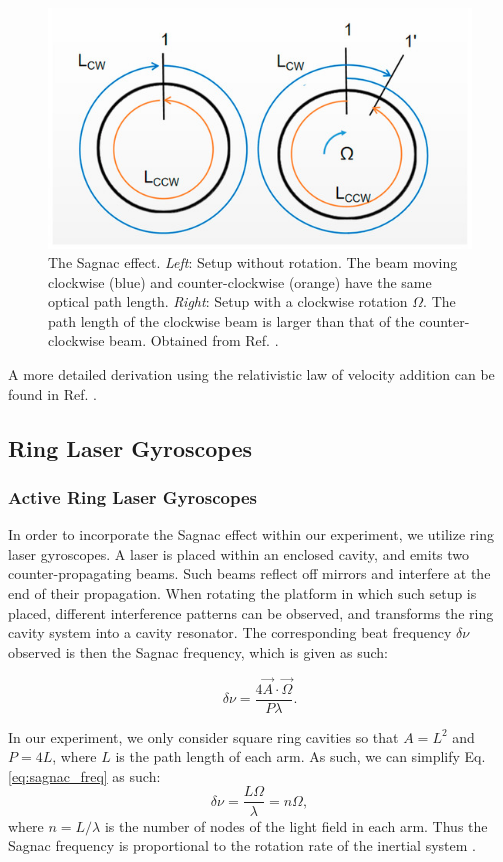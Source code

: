\documentclass[a4paper]{report}
\numberwithin{equation}{section}
\begin{document}
\begin{figure}[h!]
	\centering
	\includegraphics[width=0.6\columnwidth]{sagnac_effect.jpg}
	\caption{The Sagnac effect. \textit{Left}: Setup without rotation. The beam moving clockwise (blue) and counter-clockwise (orange)
	have the same optical path length. \textit{Right}: Setup with a clockwise rotation $\Omega$. The path length of the 
	clockwise beam is larger than that of the counter-clockwise beam. Obtained from Ref. \cite{Feng2020}.}
	\label{fig:sagnac_effect}
\end{figure}

A more detailed derivation using the relativistic law of velocity addition can be found in Ref. \cite{Benedetto2019}. 

\subsection{Ring Laser Gyroscopes}

\subsubsection{Active Ring Laser Gyroscopes}

In order to incorporate the Sagnac effect within our experiment, we utilize ring laser gyroscopes. A laser is placed within an 
enclosed cavity, and emits two counter-propagating beams. Such beams reflect off mirrors and interfere at the end of their 
propagation. When rotating the platform in which such setup is placed, different interference patterns can be observed, and 
transforms the ring cavity system into a cavity resonator. The corresponding beat frequency $\delta \nu$ observed is then the 
Sagnac frequency, which is given as such:

\begin{equation}
	\delta \nu = \frac{4 \vec{A} \cdot \vec{\Omega}}{P \lambda}.
	\label{eq:sagnac_freq}
\end{equation}

In our experiment, we only consider square ring cavities so that $A = L^2$ and $P = 4L$, where $L$ is the path length of each arm. 
As such, we can simplify Eq. \ref{eq:sagnac_freq} as such: 
\begin{equation}
	\delta \nu  = \frac{L \Omega}{\lambda} = n \Omega,
\end{equation}
where $n = L / \lambda$ is the number of nodes of the light field in each arm. Thus the Sagnac frequency is proportional to the rotation rate
of the inertial system \cite{Groh2021}.\par 
\end{document}
